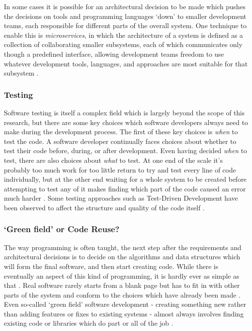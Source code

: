 In some cases it is possible for an architectural decision to be made which pushes the decisions on tools and programming languages `down' to smaller development teams, each responsible for different parts of the overall system. One technique to enable this is \emph{microservices}, in which the architecture of a system is defined as a collection of collaborating smaller subsystems, each of which communicates only though a predefined interface, allowing development teams freedom to use whatever development tools, languages, and approaches are most suitable for that subsystem \citep{Chen2022}.

\subsubsection{Testing}

Software testing is itself a complex field \citep{Whittaker2000} which is largely beyond the scope of this research, but there are some key choices which software developers always need to make during the development process. The first of these key choices is \emph{when} to test the code. A software developer continually faces choices about whether to test their code before, during, or after development. Even having decided \emph{when} to test, there are also choices about \emph{what} to test. At one end of the scale it's probably too much work for too little return to try and test every line of code individually, but at the other end waiting for a whole system to be created before attempting to test any of it makes finding which part of the code caused an error much harder \citep{Singh2012}. Some testing approaches such as Test-Driven Development \citep{Beck2022} have been observed to affect the structure and quality of the code itself \citep{George2004}.

\subsubsection{`Green field' or Code Reuse?}

The way programming is often taught, the next step after the requirements and architectural decisions is to decide on the algorithms and data structures which will form the final software, and then start creating code. While there is eventually an aspect of this kind of programming, it is hardly ever as simple as that \citep{Cusumano1995}. Real software rarely starts from a blank page but has to fit in with other parts of the system and conform to the choices which have already been made \citep{Spinellis2006}. Even so-called `green field' software development - creating something new rather than adding features or fixes to existing systems - almost always involves finding existing code or libraries which do part or all of the job \citep{Bjarnason2023} \citep{Sametinger1997}.

